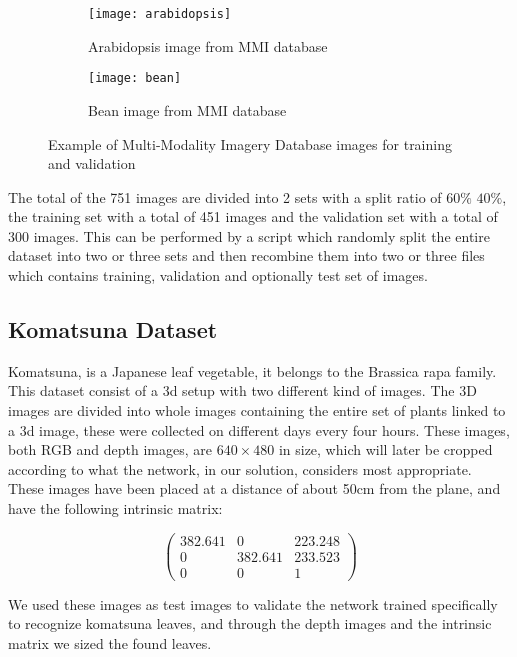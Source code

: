 \begin{figure}[ht] 
    \centering
    \begin{subfigure}{.5\textwidth}
      \centering
      \texttt{[image: arabidopsis]}
      \caption{Arabidopsis image from MMI database}
      \label{fig:sub1}
    \end{subfigure}%
    \begin{subfigure}{.5\textwidth}
      \centering
      \texttt{[image: bean]}
      \caption{Bean image from MMI database}
      \label{fig:sub2}
    \end{subfigure}
    \caption{Example of Multi-Modality Imagery Database images for training and validation}
    \label{fig:MMI}
\end{figure}

The total of the 751 images are divided into 2 sets with a split ratio of $60\%$ $40\%$, the training set with a total of 451 images and the validation set with a
total of 300 images. This can be performed by a script which randomly split the entire dataset into two or three sets and then recombine them into two or three files which
contains training, validation and optionally test set of images.

\subsection{Komatsuna Dataset}
Komatsuna, is a Japanese leaf vegetable, it belongs to the Brassica rapa family. This dataset consist of a 3d setup with two different kind of images. The 3D images are
divided into whole images containing the entire set of plants linked to a 3d image, these were collected on different days every four hours. These images, both RGB and
depth images, are $640\times 480$ in size, which will later be cropped according to what the network, in our solution, considers most appropriate. These images have been
placed at a distance of about 50cm from the plane, and have the following intrinsic matrix:

$$
\begin{pmatrix}
    382.641 & 0       & 223.248 \\     
    0       & 382.641 & 233.523 \\
    0       &       0 & 1
\end{pmatrix}
$$

We used these images as test images to validate the network trained specifically to recognize komatsuna leaves, and through the depth images and the intrinsic matrix
we sized the found leaves.

